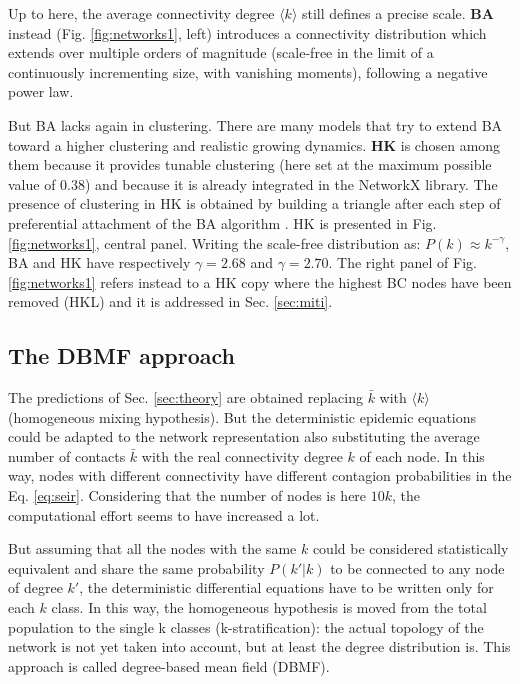 \documentclass[DIV=12, BCOR=0pt]{scrartcl}  %
\begin{document}
  
  Up to here, the average connectivity degree $\langle k \rangle$ still defines a precise scale. \textbf{BA} instead (Fig. \ref{fig:networks1}, left) introduces a connectivity distribution which extends over multiple orders of magnitude (scale-free in the limit of a continuously incrementing size, with vanishing moments), following a negative power law.
  
  But BA lacks again in clustering. There are many models that try to extend BA toward a higher clustering and realistic growing dynamics. \textbf{HK} is chosen among them because it provides tunable clustering (here set at the maximum possible value of $0.38$) and because it is already integrated in the NetworkX library. The presence of clustering in HK is obtained by building a triangle after each step of preferential attachment of the BA algorithm \citep{Holme}.
  HK is presented in Fig. \ref{fig:networks1}, central panel. Writing the scale-free distribution as: $P(k) \approx k^{- \gamma}$, BA and HK have respectively $\gamma = 2.68$ and $\gamma = 2.70$.
  The right panel of Fig. \ref{fig:networks1} refers instead to a HK copy where the highest BC nodes have been removed (HKL) and it is addressed in Sec. \ref{sec:miti}.
  
  
  \subsection{The DBMF approach} 
  The predictions of Sec. \ref{sec:theory} are obtained replacing $\bar{k}$ with $\langle k \rangle$ (homogeneous mixing hypothesis). But the deterministic epidemic equations could be adapted to the network representation also substituting the average number of contacts $\bar{k}$ with the real connectivity degree $k$ of each node. In this way, nodes with different connectivity have different contagion probabilities in the Eq. \ref{eq:seir}. Considering that the number of nodes is here $10k$, the computational effort seems to have increased a lot.
  
  But assuming that all the nodes with the same $k$ could be considered statistically equivalent and share the same probability $P(k'|k)$ to be connected to any node of degree $k'$, the deterministic differential equations have to be written only for each $k$ class.
  In this way, the homogeneous hypothesis is moved from the total population to the single k classes (k-stratification): the actual topology of the network is not yet taken into account, but at least the degree distribution is. This approach is called degree-based mean field (DBMF).
  
\end{document}

